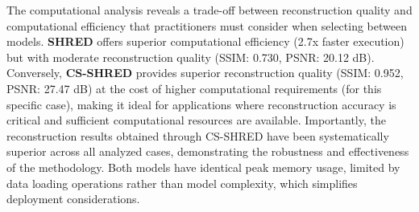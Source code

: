 The computational analysis reveals a trade-off between reconstruction quality and computational efficiency that practitioners must consider when selecting between models. \textbf{SHRED} offers superior computational efficiency (2.7x faster execution) but with moderate reconstruction quality (SSIM: 0.730, PSNR: 20.12 dB). Conversely, \textbf{CS-SHRED} provides superior reconstruction quality (SSIM: 0.952, PSNR: 27.47 dB) at the cost of higher computational requirements (for this specific case), making it ideal for applications where reconstruction accuracy is critical and sufficient computational resources are available. Importantly, the reconstruction results obtained through CS-SHRED have been systematically superior across all analyzed cases, demonstrating the robustness and effectiveness of the methodology. Both models have identical peak memory usage, limited by data loading operations rather than model complexity, which simplifies deployment considerations. 